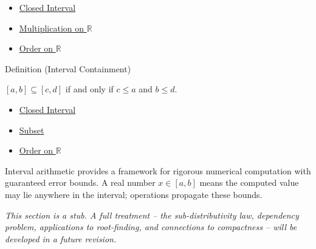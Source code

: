 \begin{dependencies}
\begin{itemize}
  \item \hyperref[def:closed-interval]{Closed Interval}
  \item \hyperref[def:multiplication-on-r]{Multiplication on $\mathbb{R}$}
  \item \hyperref[def:order-on-r]{Order on $\mathbb{R}$}
\end{itemize}
\end{dependencies}

\begin{definitionbox}{Definition (Interval Containment)}
\begin{definition}\label{def:interval-contain}
$[a,b] \subseteq [c,d]$ if and only if $c \leq a$ and $b \leq d$.
\end{definition}
\end{definitionbox}

\begin{dependencies}
\begin{itemize}
  \item \hyperref[def:closed-interval]{Closed Interval}
  \item \hyperref[def:subset]{Subset}
  \item \hyperref[def:order-on-r]{Order on $\mathbb{R}$}
\end{itemize}
\end{dependencies}

\begin{remark*}[Motivation]
Interval arithmetic provides a framework for rigorous numerical computation
with guaranteed error bounds. A real number $x \in [a,b]$ means the computed
value may lie anywhere in the interval; operations propagate these bounds.
\end{remark*}

\begin{remark*}[Status]
\textit{This section is a stub. A full treatment -- the sub-distributivity law,
dependency problem, applications to root-finding, and connections to
compactness -- will be developed in a future revision.}
\end{remark*}
